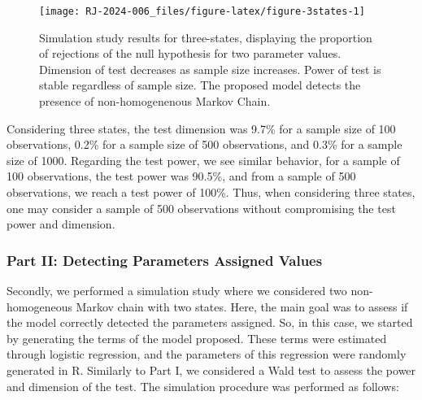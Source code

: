 \begin{figure}

{\centering \texttt{[image: RJ-2024-006\_files/figure-latex/figure-3states-1]} 

}

\caption{Simulation study results for three-states, displaying the proportion of rejections of the null hypothesis for two parameter values. Dimension of test decreases as sample size increases. Power of test is stable regardless of sample size. The proposed model detects the presence of non-homogenenous Markov Chain.}\label{fig:figure-3states}
\end{figure}

Considering three states, the test dimension was 9.7\% for a sample size of 100 observations, 0.2\% for a sample size of 500 observations, and 0.3\% for a sample size of 1000. Regarding the test power, we see similar behavior, for a sample of 100 observations, the test power was 90.5\%, and from a sample of 500 observations, we reach a test power of 100\%. Thus, when considering three states, one may consider a sample of 500 observations without compromising the test power and dimension.

\newpage

\subsubsection{Part II: Detecting Parameters Assigned Values}\label{part-ii-detecting-parameters-assigned-values}

Secondly, we performed a simulation study where we considered two non-homogeneous Markov chain with two states. Here, the main goal was to assess if the model correctly detected the parameters assigned. So, in this case, we started by generating the terms of the model proposed. These terms were estimated through logistic regression, and the parameters of this regression were randomly generated in R. Similarly to Part I, we considered a Wald test to assess the power and dimension of the test. The simulation procedure was performed as follows:

